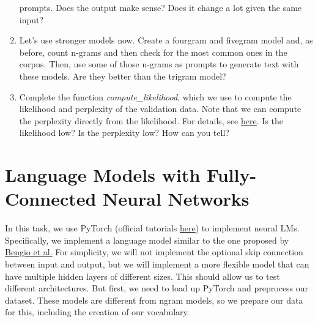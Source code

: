 \documentclass[11pt,a4paper]{article}
\begin{document}
\begin{enumerate}[label=(\alph*)]
          prompts.
          Does the output make sense? Does it change a lot given the same input?
    \item Let's use stronger models now.
          Create a fourgram and fivegram model and, as before, count n-grams and
          then check for the most common ones in the corpus.
          Then, use some of those n-grams as prompts to generate text with
          these models.
          Are they better than the trigram model?
    \item Complete the function \emph{compute\_likelihood}, which we use
          to compute the likelihood and perplexity of the validation data.
          Note that we can compute the perplexity directly from the likelihood.
          For details, see
          \href{https://en.wikipedia.org/wiki/Perplexity}{\underline{here}}.
          Is the likelihood low? Is the perplexity low? How can you tell?
\end{enumerate}

\section{Language Models with Fully-Connected Neural Networks}

In this task, we use PyTorch (official tutorials
\href{https://pytorch.org/tutorials/}{here}) to implement neural LMs.
Specifically, we implement a language model similar to the one proposed by
\href{https://www.jmlr.org/papers/volume3/bengio03a/bengio03a.pdf}{\underline{Bengio et al.}}
For simplicity, we will not implement the optional skip connection between input
and output, but we will implement a more flexible model that can have multiple
hidden layers of different sizes.
This should allow us to test different architectures.
But first, we need to load up PyTorch and preprocess our dataset.
These models are different from ngram models, so we prepare our data for this,
including the creation of our vocabulary.
\end{document}
